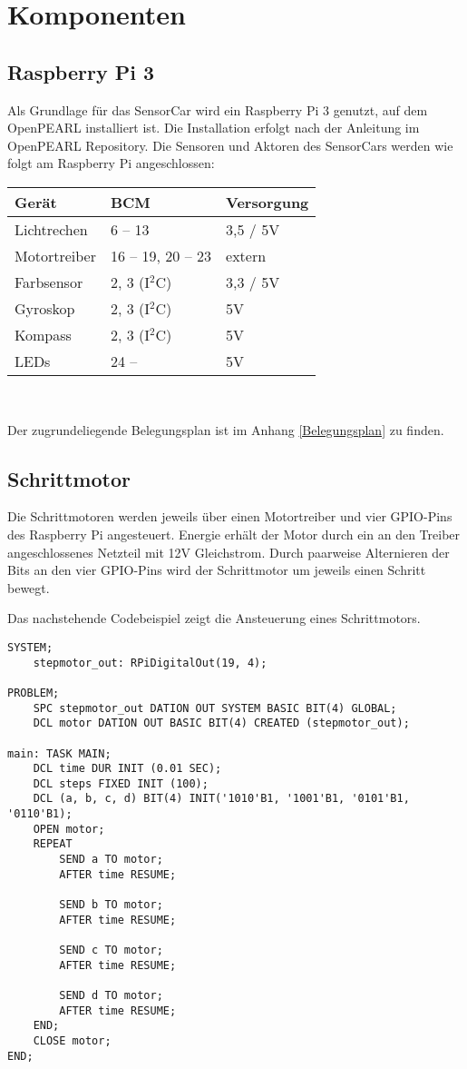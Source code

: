 \chapter{Komponenten}
\section{Raspberry Pi 3}
Als Grundlage für das SensorCar wird ein Raspberry Pi 3 genutzt, auf dem OpenPEARL installiert ist. Die Installation erfolgt nach der Anleitung im OpenPEARL Repository. Die Sensoren und Aktoren des SensorCars werden wie folgt am Raspberry Pi angeschlossen:

\begin{center}
\begin{tabular}{|l|l|l|}
	\hline
	\textbf{Gerät} & \textbf{BCM} & \textbf{Versorgung}\\
	\hline
	Lichtrechen & 6 -- 13 & 3,5 / 5V\\
	\hline
	Motortreiber& 16 -- 19, 20 -- 23 & extern\\
	\hline
	Farbsensor & 2, 3 (I$^2$C) & 3,3 / 5V\\
	\hline
	Gyroskop & 2, 3 (I$^2$C) & 5V\\
	\hline
	Kompass & 2, 3 (I$^2$C) & 5V\\
	\hline
	LEDs & 24 -- & 5V\\
	\hline
\end{tabular}\\
\end{center}
Der zugrundeliegende Belegungsplan ist im Anhang \ref{Belegungsplan} zu finden.


\section{Schrittmotor}
Die Schrittmotoren werden jeweils über einen Motortreiber und vier GPIO-Pins des Raspberry Pi angesteuert. Energie erhält der Motor durch ein an den Treiber angeschlossenes Netzteil mit 12V Gleichstrom. Durch paarweise Alternieren der Bits an den vier GPIO-Pins wird der Schrittmotor um jeweils einen Schritt bewegt. 

Das nachstehende Codebeispiel zeigt die Ansteuerung eines Schrittmotors.\\

\begin{lstlisting}
SYSTEM;
	stepmotor_out: RPiDigitalOut(19, 4);

PROBLEM;
	SPC stepmotor_out DATION OUT SYSTEM BASIC BIT(4) GLOBAL;
	DCL motor DATION OUT BASIC BIT(4) CREATED (stepmotor_out);

main: TASK MAIN;
	DCL time DUR INIT (0.01 SEC);
	DCL steps FIXED INIT (100);
	DCL (a, b, c, d) BIT(4) INIT('1010'B1, '1001'B1, '0101'B1, '0110'B1);
	OPEN motor;
	REPEAT
		SEND a TO motor;
		AFTER time RESUME;
		
		SEND b TO motor;
		AFTER time RESUME;
		
		SEND c TO motor;
		AFTER time RESUME;
		
		SEND d TO motor;
		AFTER time RESUME;
	END;
	CLOSE motor;
END;
\end{lstlisting}

